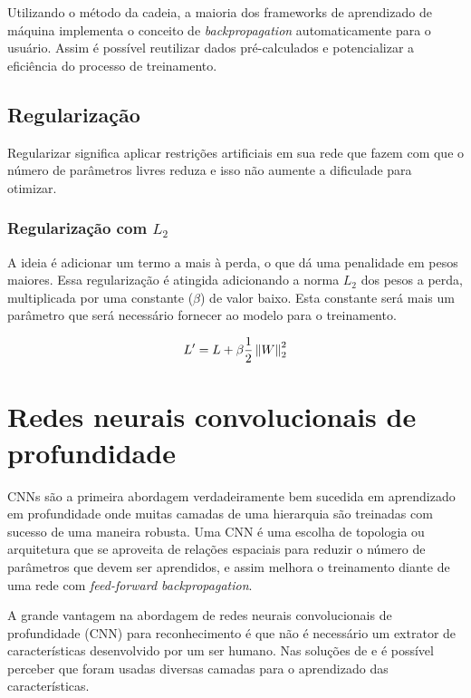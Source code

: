 Utilizando o método da cadeia, a maioria dos frameworks de aprendizado
de máquina implementa o conceito de \textit{backpropagation}
automaticamente para o usuário. Assim é possível reutilizar dados
pré-calculados e potencializar a eficiência do processo de
treinamento.

\subsection{Regularização}

Regularizar significa aplicar restrições artificiais em sua rede que
fazem com que o número de parâmetros livres reduza e isso não aumente
a dificulade para otimizar.

\subsubsection{Regularização com $L_2$}

A ideia é adicionar um termo a mais à perda, o que dá uma penalidade
em pesos maiores. Essa regularização é atingida adicionando a norma $L_2$
dos pesos a perda, multiplicada por uma constante ($\beta$) de valor
baixo. Esta constante será mais um parâmetro que será necessário
fornecer ao modelo para o treinamento.

\begin{equation}
L' = L + \beta\frac{1}{2} \left\lVert W\right\rVert_2^2
\end{equation}

\section{Redes neurais convolucionais de profundidade}

CNNs são a primeira abordagem verdadeiramente bem sucedida em
aprendizado em profundidade onde muitas camadas de uma hierarquia são
treinadas com sucesso de uma maneira robusta. Uma CNN é uma escolha
de topologia ou arquitetura que se aproveita de relações espaciais
para reduzir o número de parâmetros que devem ser aprendidos, e assim
melhora o treinamento diante de uma rede com \textit{feed-forward
  backpropagation}\cite{Arel2010}.

A grande vantagem na abordagem de redes neurais convolucionais de
profundidade (CNN) para reconhecimento é que não é necessário um
extrator de características desenvolvido por um ser humano. Nas
soluções de \cite{Krizhevsky} e \cite{Goodfellow} é possível perceber
que foram usadas diversas camadas para o aprendizado das
características.

